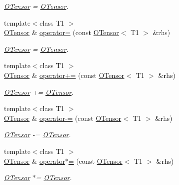 \begin{DoxyCompactItemize}
\begin{DoxyCompactList}\small\item\em \mbox{\hyperlink{classENSEM_1_1OTensor}{O\+Tensor}} = \mbox{\hyperlink{classENSEM_1_1OTensor}{O\+Tensor}}. \end{DoxyCompactList}\item 
{\footnotesize template$<$class T1 $>$ }\\\mbox{\hyperlink{classENSEM_1_1OTensor}{O\+Tensor}} \& \mbox{\hyperlink{classENSEM_1_1OTensor_a96fac7277ac1df849789d53b761e5e68}{operator=}} (const \mbox{\hyperlink{classENSEM_1_1OTensor}{O\+Tensor}}$<$ T1 $>$ \&rhs)
\begin{DoxyCompactList}\small\item\em \mbox{\hyperlink{classENSEM_1_1OTensor}{O\+Tensor}} = \mbox{\hyperlink{classENSEM_1_1OTensor}{O\+Tensor}}. \end{DoxyCompactList}\item 
{\footnotesize template$<$class T1 $>$ }\\\mbox{\hyperlink{classENSEM_1_1OTensor}{O\+Tensor}} \& \mbox{\hyperlink{classENSEM_1_1OTensor_a621ebf0d6d94eb56c1e3b31cb8c933b1}{operator+=}} (const \mbox{\hyperlink{classENSEM_1_1OTensor}{O\+Tensor}}$<$ T1 $>$ \&rhs)
\begin{DoxyCompactList}\small\item\em \mbox{\hyperlink{classENSEM_1_1OTensor}{O\+Tensor}} += \mbox{\hyperlink{classENSEM_1_1OTensor}{O\+Tensor}}. \end{DoxyCompactList}\item 
{\footnotesize template$<$class T1 $>$ }\\\mbox{\hyperlink{classENSEM_1_1OTensor}{O\+Tensor}} \& \mbox{\hyperlink{classENSEM_1_1OTensor_a8a087d8889bb41eafd237e270e4182fa}{operator-\/=}} (const \mbox{\hyperlink{classENSEM_1_1OTensor}{O\+Tensor}}$<$ T1 $>$ \&rhs)
\begin{DoxyCompactList}\small\item\em \mbox{\hyperlink{classENSEM_1_1OTensor}{O\+Tensor}} -\/= \mbox{\hyperlink{classENSEM_1_1OTensor}{O\+Tensor}}. \end{DoxyCompactList}\item 
{\footnotesize template$<$class T1 $>$ }\\\mbox{\hyperlink{classENSEM_1_1OTensor}{O\+Tensor}} \& \mbox{\hyperlink{classENSEM_1_1OTensor_a6edba72b265fa3629417ad85c9ae1477}{operator$\ast$=}} (const \mbox{\hyperlink{classENSEM_1_1OTensor}{O\+Tensor}}$<$ T1 $>$ \&rhs)
\begin{DoxyCompactList}\small\item\em \mbox{\hyperlink{classENSEM_1_1OTensor}{O\+Tensor}} $\ast$= \mbox{\hyperlink{classENSEM_1_1OTensor}{O\+Tensor}}. \end{DoxyCompactList}\item 

\end{DoxyCompactItemize}
